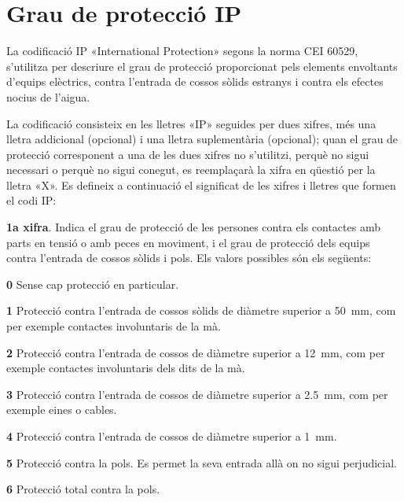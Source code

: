 \section{Grau de protecció IP}   

La codificació IP «International Protection»  segons la
norma CEI 60529, s'utilitza per descriure el grau de
protecció  proporcionat pels elements envoltants d'equips elèctrics, contra
l'entrada de cossos sòlids estranys i contra els efectes nocius
de l'aigua.

La codificació consisteix en les lletres «IP»
seguides per dues xifres, més una lletra addicional (opcional) i una
lletra suplementària (opcional); quan el grau de protecció
corresponent a una de les dues xifres no s'utilitzi, perquè no sigui
necessari o perquè no sigui conegut, es reemplaçarà la xifra en
qüestió per la lletra «X». Es defineix a continuació el
significat de les xifres i lletres que formen el codi IP:

\textbf{1a xifra}. Indica el grau de protecció de les persones contra els contactes amb
parts en tensió o amb peces en moviment, i el grau de protecció dels equips contra l'entrada de cossos sòlids i pols. Els valors possibles són els següents:
\begin{list}{}
   {\setlength{\labelwidth}{10mm} \setlength{\leftmargin}{10mm} \setlength{\labelsep}{2mm}}
   \item[\textbf{0}] Sense cap protecció en particular.
   \item[\textbf{1}] Protecció contra l'entrada de cossos sòlids de diàmetre superior a \SI{50}{mm},
   com per exemple   contactes involuntaris de la mà.
   \item[\textbf{2}] Protecció contra l'entrada de cossos de diàmetre superior a \SI{12}{mm}, com per exemple
   contactes involuntaris dels dits de la mà.
   \item[\textbf{3}] Protecció contra l'entrada de cossos de diàmetre superior a \SI{2,5}{mm},
   com per exemple eines o cables.
   \item[\textbf{4}] Protecció contra l'entrada de cossos de diàmetre superior a \SI{1}{mm}.
   \item[\textbf{5}] Protecció contra la pols. Es permet la seva entrada allà on no sigui perjudicial.
   \item[\textbf{6}] Protecció total contra la pols.
\end{list}

